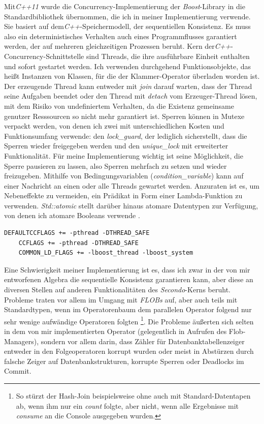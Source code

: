\documentclass[a4paper,12pt,twoside]{article}
\newcommand{\Fb}[1]{\textit{#1}} %
\begin{document}
Mit\Fb{C++11} wurde die Concurrency-Implementierung der \Fb{Boost}-Library in die Standardbibliothek übernommen, die ich in meiner Implementierung verwende. Sie basiert auf dem\Fb{C++}-Speichermodell, der sequentiellen Konsistenz. Es muss also ein deterministisches Verhalten auch eines Programmflusses garantiert werden, der auf mehreren gleichzeitigen Prozessen beruht. Kern der\Fb{C++}-Concurrency-Schnittstelle sind Threads, die ihre ausführbare Einheit enthalten und sofort gestartet werden. Ich verwenden durchgehend Funktionsobjekte, das heißt Instanzen von Klassen, für die der Klammer-Operator überladen worden ist. Der erzeugende Thread kann entweder mit \Fb{join} darauf warten, dass der Thread seine Aufgaben beendet oder den Thread mit \Fb{detach} vom Erzeuger-Thread lösen, mit dem Risiko von undefiniertem Verhalten, da die Existenz gemeinsame genutzer Resssourcen so nicht mehr garantiert ist. Sperren können in Mutexe verpackt werden, von denen ich zwei mit unterschiedlichen Kosten und Funktionsumfang verwende: den \Fb{lock\_guard}, der lediglich sicherstellt, dass die Sperren wieder freigegeben werden und den \Fb{unique\_lock} mit erweiterter Funktionalität. Für meine Implementierung wichtig ist seine Möglichkeit, die Sperre pausieren zu lassen, also Sperren mehrfach zu setzen und wieder freizugeben. Mithilfe von Bedingungsvariablen (\Fb{condition\_variable}) kann auf einer Nachricht an einen oder alle Threads gewartet werden. Anzuraten ist es, um Nebeneffekte zu vermeiden, ein Prädikat in Form einer Lambda-Funktion zu verwenden. \Fb{Std::atomic} stellt darüber hinaus atomare Datentypen zur Verfügung, von denen ich atomare Booleans verwende \parencite{Grimm2018}. 

\begin{minipage}{0.95\textwidth}
	\begin{lstlisting}[caption={Flags der \Fb{MThreaded}-Algebra.}, label=list:flags]
	DEFAULTCCFLAGS += -pthread -DTHREAD_SAFE
	CCFLAGS += -pthread -DTHREAD_SAFE
	COMMON_LD_FLAGS += -lboost_thread -lboost_system
	\end{lstlisting}
\end{minipage}

Eine Schwierigkeit meiner Implementierung ist es, dass ich zwar in der von mir entworfenen Algebra die sequentielle Konsistenz garantieren kann, aber diese an diversen Stellen auf anderen Funktionalitäten des \Fb{Secondo}-Kerns beruht. Probleme traten vor allem im Umgang mit \Fb{FLOBs} auf, aber auch teils mit Standardtypen, wenn im Operatorenbaum dem parallelen Operator folgend nur sehr wenige aufwändige Operatoren folgten \footnote{So stürzt der Hash-Join beispielsweise ohne auch mit Standard-Datentapen ab, wenn ihm nur ein \Fb{count} folgte, aber nicht, wenn alle Ergebnisse mit \Fb{consume} an die Console ausgegeben wurden.}. Die Probleme äußerten sich selten in dem von mir implementierten Operator (gelegentlich in Aufrufen des Flob-Managers), sondern vor allem darin, dass Zähler für Datenbanktabellenzeiger entweder in den Folgeoperatoren korrupt wurden oder meist in Abstürzen durch falsche Zeiger auf Datenbankstrukturen, korrupte Sperren oder Deadlocks im Commit. 
\end{document}
